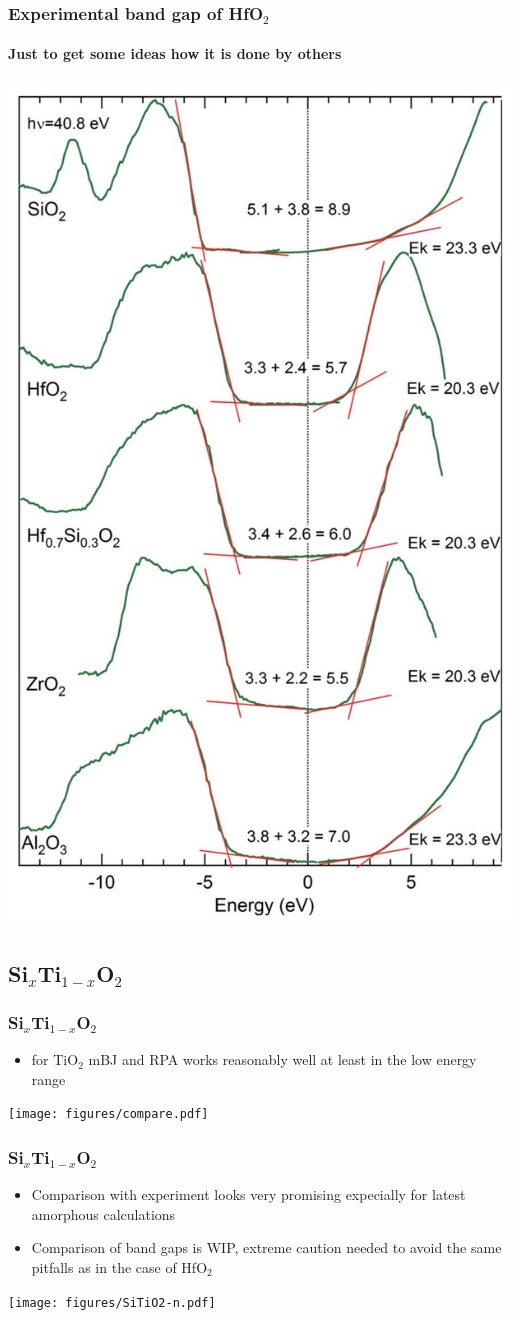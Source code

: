 \documentclass{beamer}
\begin{document}
\begin{frame}
    \frametitle{Experimental band gap of HfO$_2$}
    \framesubtitle{Just to get some ideas how it is done by others}

\vspace{-0.3cm}
\begin{center}
        \includegraphics[width=0.38\linewidth]{figures/DOS.png}
\end{center}

\end{frame}

\subsection{Si$_x$Ti$_{1-x}$O$_2$}

\begin{frame}
\frametitle{Si$_x$Ti$_{1-x}$O$_2$}
\begin{itemize}
	\item for TiO$_2$ mBJ and RPA works reasonably well at least in the low energy range
\end{itemize}

\begin{center}
        \texttt{[image: figures/compare.pdf]}
\end{center}

\end{frame}

\begin{frame}
\frametitle{Si$_x$Ti$_{1-x}$O$_2$}
\begin{itemize}
	\item Comparison with experiment looks very promising expecially for latest amorphous calculations 
	\item Comparison of band gaps is WIP, extreme caution needed to avoid the same pitfalls as in the case of HfO$_2$
\end{itemize}

\begin{center}
        \texttt{[image: figures/SiTiO2-n.pdf]}
\end{center}

\end{frame}
\end{document}
